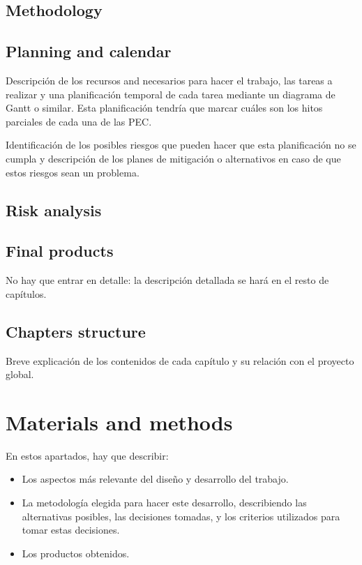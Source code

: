 \documentclass[ENG, BIB]{TFUOC}%
\begin{document}
\section{Methodology}

\section{Planning and calendar}

Descripción de los recursos and necesarios para hacer el trabajo, las tareas a realizar y una planificación temporal de cada tarea mediante un diagrama de Gantt o similar. Esta planificación tendría que marcar cuáles son los hitos parciales de cada una de las PEC.

Identificación de los posibles riesgos que pueden hacer que esta planificación no se cumpla y descripción de los planes de mitigación o alternativos en caso de que estos riesgos sean un problema.

\section{Risk analysis}

\section{Final products}
No hay que entrar en detalle: la descripción detallada se hará en el resto de capítulos.

\section{Chapters structure}
Breve explicación de los contenidos de cada capítulo y su relación con el proyecto global.




\chapter{Materials and methods}
En estos apartados, hay que describir:
\begin{itemize}
    \item Los aspectos más relevante del diseño y desarrollo del trabajo.
    \item La metodología elegida para hacer este desarrollo, describiendo las alternativas posibles, las decisiones tomadas, y los criterios utilizados para tomar estas decisiones.
    \item Los productos obtenidos.
\end{itemize}
\end{document}
